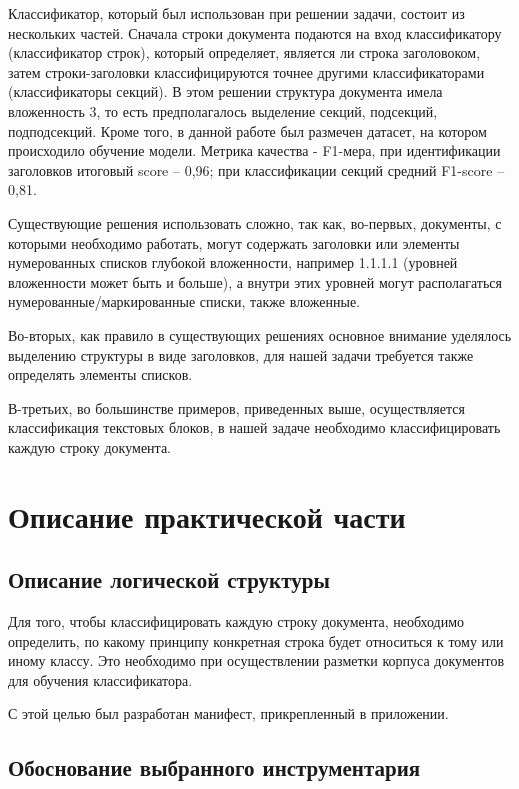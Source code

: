 \documentclass[a4paper,12pt]{article}
\begin{document}
Классификатор, который был использован при решении задачи, состоит из нескольких частей. Сначала строки документа подаются на вход классификатору (классификатор строк), который определяет, является ли строка заголовоком, затем строки-заголовки классифицируются точнее другими классификаторами (классификаторы секций). В этом решении структура документа имела вложенность 3, то есть предполагалось выделение секций, подсекций, подподсекций.
Кроме того, в данной работе был размечен датасет, на котором происходило обучение модели. Метрика качества - F1-мера, при идентификации заголовков итоговый score -- 0,96; при классификации секций средний F1-score -- 0,81.

Существующие решения использовать сложно, так как, во-первых, документы, с которыми необходимо работать, могут содержать заголовки или элементы нумерованных списков глубокой вложенности, например 1.1.1.1 (уровней вложенности может быть и больше), а внутри этих уровней могут располагаться нумерованные/маркированные списки, также вложенные.

Во-вторых, как правило в существующих решениях основное внимание уделялось выделению структуры в виде заголовков, для нашей задачи требуется также определять элементы списков.

В-третьих, во большинстве примеров, приведенных выше, осуществляется классификация текстовых блоков, в нашей задаче необходимо классифицировать каждую строку документа.

\newpage
\section{Описание практической части}

\subsection{Описание логической структуры}

Для того, чтобы классифицировать каждую строку документа, необходимо определить, по какому принципу конкретная строка будет относиться к тому или иному классу. Это необходимо при осуществлении разметки корпуса документов для обучения классификатора. 

С этой целью был разработан манифест, прикрепленный в приложении.

\subsection{Обоснование выбранного инструментария}
\end{document}
